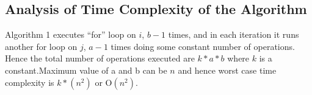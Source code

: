 \documentclass[11pt]{article}
\begin{document}
\subsection{Analysis of Time Complexity of the Algorithm}
Algorithm 1 executes ``for'' loop on $i$, $b-1$ times, and in each iteration it runs another for loop on $j$, $a-1$ times doing some constant number of operations. \\
Hence the total number of operations executed are $k*a*b$ where $k$ is a constant.Maximum value of a and b can be $n$ and hence worst case time complexity is $k*(n^2)$ or O$(n^2)$.

\cite{latex}
\cite{xfig}
\cite{wikipediainfo}


\end{document}

